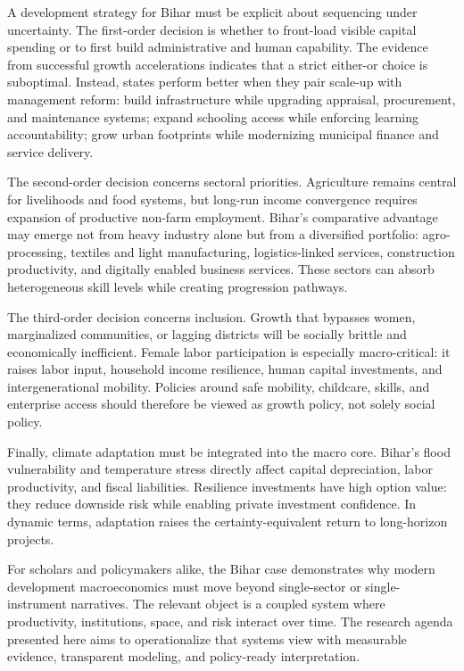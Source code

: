 \documentclass[preprint,12pt]{elsarticle}
\begin{document}
A development strategy for Bihar must be explicit about sequencing under uncertainty. The first-order decision is whether to front-load visible capital spending or to first build administrative and human capability. The evidence from successful growth accelerations indicates that a strict either-or choice is suboptimal. Instead, states perform better when they pair scale-up with management reform: build infrastructure while upgrading appraisal, procurement, and maintenance systems; expand schooling access while enforcing learning accountability; grow urban footprints while modernizing municipal finance and service delivery.

The second-order decision concerns sectoral priorities. Agriculture remains central for livelihoods and food systems, but long-run income convergence requires expansion of productive non-farm employment. Bihar's comparative advantage may emerge not from heavy industry alone but from a diversified portfolio: agro-processing, textiles and light manufacturing, logistics-linked services, construction productivity, and digitally enabled business services. These sectors can absorb heterogeneous skill levels while creating progression pathways.

The third-order decision concerns inclusion. Growth that bypasses women, marginalized communities, or lagging districts will be socially brittle and economically inefficient. Female labor participation is especially macro-critical: it raises labor input, household income resilience, human capital investments, and intergenerational mobility. Policies around safe mobility, childcare, skills, and enterprise access should therefore be viewed as growth policy, not solely social policy.

Finally, climate adaptation must be integrated into the macro core. Bihar's flood vulnerability and temperature stress directly affect capital depreciation, labor productivity, and fiscal liabilities. Resilience investments have high option value: they reduce downside risk while enabling private investment confidence. In dynamic terms, adaptation raises the certainty-equivalent return to long-horizon projects.

For scholars and policymakers alike, the Bihar case demonstrates why modern development macroeconomics must move beyond single-sector or single-instrument narratives. The relevant object is a coupled system where productivity, institutions, space, and risk interact over time. The research agenda presented here aims to operationalize that systems view with measurable evidence, transparent modeling, and policy-ready interpretation.
\end{document}
